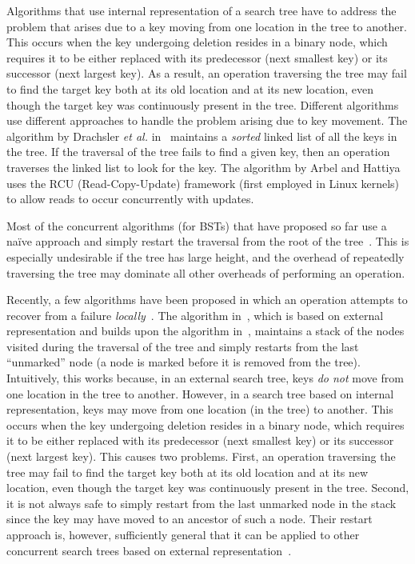 Algorithms that use internal representation of a search tree have to address the problem that arises due to a key moving from one location in the tree to another. This occurs when the key undergoing deletion resides in a binary node, which requires it to be either replaced with its predecessor (next smallest key) or its successor (next largest key). As a result, an operation traversing the tree may fail to find the target key both at its old location and at its new location, even though the target key was continuously present in the tree. Different algorithms use different approaches to handle the problem arising due to key movement. The algorithm by Drachsler \emph{et al.} in~\cite{DraVec+:2014:PPoPP} maintains a \emph{sorted} linked list of all the keys in the tree. If the traversal of the tree fails to find a given key, then an operation traverses the linked list to look for the key. The algorithm by Arbel and Hattiya~\cite{ArbAtt:2014:PODC} uses the RCU (Read-Copy-Update) framework (first employed in Linux kernels) to allow reads to occur concurrently with updates.

Most of the concurrent algorithms (for BSTs) that have proposed so far use a na{\"i}ve approach and simply restart the traversal from the root of the tree~\cite{EllFat+:2010:PODC,HowJon:2012:SPAA,NatMit:2014:PPoPP,DraVec+:2014:PPoPP,ArbAtt:2014:PODC}. This is especially undesirable if the tree has large height, and the overhead of repeatedly traversing the tree may dominate all other overheads of performing an operation.

Recently, a few algorithms have been proposed in which an operation attempts to recover from a failure \emph{locally}~\cite{EllFat+:2014:PODC,ChaDan+:2014:PODC}. The algorithm in~\cite{EllFat+:2014:PODC}, which is based on external representation and builds upon the algorithm in~\cite{EllFat+:2010:PODC}, maintains a stack of the nodes visited during the traversal of the tree and simply restarts from the last ``unmarked'' node  (a node is marked before it is removed from the tree). Intuitively, this works because, in an external search tree, keys \emph{do not} move from one location in the tree to another. However, in a search tree based on internal representation, keys may move from one location (in the tree) to another. This occurs when the key undergoing deletion resides in a binary node, which requires it to be either replaced with its predecessor (next smallest key) or its successor (next largest key). This causes two problems. First, an operation traversing the tree may fail to find the target key both at its old location and at its new location, even though the target key was continuously present in the tree. Second, it is not always safe to simply restart from the last unmarked node in the stack since the key may have moved to an ancestor of such a node. Their restart approach is, however, sufficiently general that it can be applied to other concurrent search trees based on external representation~\cite{NatMit:2014:PPoPP}.

